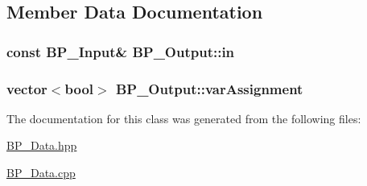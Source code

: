 \subsection{Member Data Documentation}
\hypertarget{class_b_p___output_a84649c3f9e29b7fdf080419ff590c096}{
\subsubsection[{in}]{\setlength{\rightskip}{0pt plus 5cm}const {\bf B\-P\-\_\-\-Input}\& B\-P\-\_\-\-Output\-::in\hspace{0.3cm}{\ttfamily [protected]}}}\label{class_b_p___output_a84649c3f9e29b7fdf080419ff590c096}
\hypertarget{class_b_p___output_a581b177c0383ee72b0395595641fb82b}{
\subsubsection[{var\-Assignment}]{\setlength{\rightskip}{0pt plus 5cm}vector$<$bool$>$ B\-P\-\_\-\-Output\-::var\-Assignment\hspace{0.3cm}{\ttfamily [protected]}}}\label{class_b_p___output_a581b177c0383ee72b0395595641fb82b}


The documentation for this class was generated from the following files\-:\begin{DoxyCompactItemize}
\item 
\hyperlink{_b_p___data_8hpp}{B\-P\-\_\-\-Data.\-hpp}\item 
\hyperlink{_b_p___data_8cpp}{B\-P\-\_\-\-Data.\-cpp}\end{DoxyCompactItemize}
